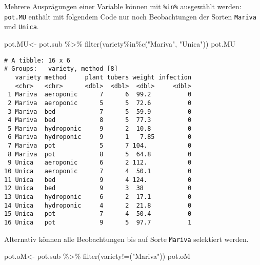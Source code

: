 \documentclass[
  letterpaper,
  DIV=11,
  numbers=noendperiod]{scrartcl}
\newenvironment{Shaded}{\begin{snugshade}}{\end{snugshade}}
\newcommand{\FunctionTok}[1]{\textcolor[rgb]{0.28,0.35,0.67}{#1}}
\newcommand{\NormalTok}[1]{\textcolor[rgb]{0.00,0.23,0.31}{#1}}
\newcommand{\OtherTok}[1]{\textcolor[rgb]{0.00,0.23,0.31}{#1}}
\newcommand{\SpecialCharTok}[1]{\textcolor[rgb]{0.37,0.37,0.37}{#1}}
\newcommand{\StringTok}[1]{\textcolor[rgb]{0.13,0.47,0.30}{#1}}
\begin{document}
Mehrere Ausprägungen einer Variable können mit \texttt{\%in\%}
ausgewählt werden: \texttt{pot.MU} enthält mit folgendem Code nur noch
Beobachtungen der Sorten \texttt{Mariva} und \texttt{Unica}.

\begin{Shaded}
\begin{Highlighting}[]
\NormalTok{pot.MU}\OtherTok{\textless{}{-}}\NormalTok{ pot.sub }\SpecialCharTok{\%\textgreater{}\%} \FunctionTok{filter}\NormalTok{(variety}\SpecialCharTok{\%in\%}\FunctionTok{c}\NormalTok{(}\StringTok{"Mariva"}\NormalTok{, }\StringTok{"Unica"}\NormalTok{))}
\NormalTok{pot.MU}
\end{Highlighting}
\end{Shaded}

\begin{verbatim}
# A tibble: 16 x 6
# Groups:   variety, method [8]
   variety method     plant tubers weight infection
   <chr>   <chr>      <dbl>  <dbl>  <dbl>     <dbl>
 1 Mariva  aeroponic      7      6  99.2          0
 2 Mariva  aeroponic      5      5  72.6          0
 3 Mariva  bed            7      5  59.9          0
 4 Mariva  bed            8      5  77.3          0
 5 Mariva  hydroponic     9      2  10.8          0
 6 Mariva  hydroponic     9      1   7.85         0
 7 Mariva  pot            5      7 104.           0
 8 Mariva  pot            8      5  64.8          0
 9 Unica   aeroponic      6      2 112.           0
10 Unica   aeroponic      7      4  50.1          0
11 Unica   bed            9      4 124.           0
12 Unica   bed            9      3  38            0
13 Unica   hydroponic     6      2  17.1          0
14 Unica   hydroponic     4      2  21.8          0
15 Unica   pot            7      4  50.4          0
16 Unica   pot            9      5  97.7          1
\end{verbatim}

Alternativ können alle Beobachtungen bis auf Sorte \texttt{Mariva}
selektiert werden.

\begin{Shaded}
\begin{Highlighting}[]
\NormalTok{pot.oM}\OtherTok{\textless{}{-}}\NormalTok{ pot.sub }\SpecialCharTok{\%\textgreater{}\%} \FunctionTok{filter}\NormalTok{(variety}\SpecialCharTok{!=}\NormalTok{(}\StringTok{"Mariva"}\NormalTok{))}
\NormalTok{pot.oM }
\end{Highlighting}
\end{Shaded}
\end{document}
